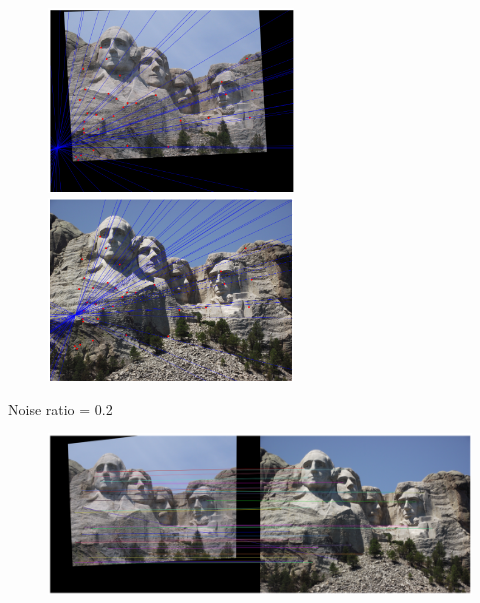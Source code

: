\documentclass[11pt]{article}
\begin{document}
\begin{figure}[H]
    \centering
    \includegraphics[width=6.5cm]{images/part3/ransac_image_1_noise_0.1_left.png}
    \includegraphics[width=6.5cm]{images/part3/ransac_image_1_noise_0.1_right.png}
\end{figure}

Noise ratio = 0.2
\begin{figure}[H]
    \centering
    \includegraphics[width=14cm]{images/part3/ransac_image_1_noise_0.2_1.png}
\end{figure}
\end{document}
